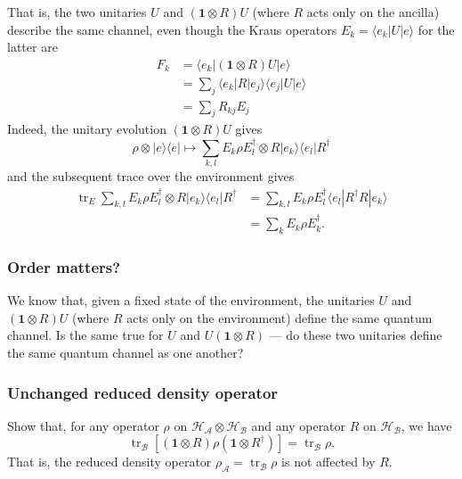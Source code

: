 \documentclass[fleqn]{article}
\begin{document}
That is, the two unitaries \(U\) and \((\mathbf{1}\otimes R)U\) (where \(R\) acts only on the ancilla) describe the same channel, even though the Kraus operators \(E_k=\langle e_k|U|e\rangle\) for the latter are
\[
  \begin{aligned}
    F_k
    &= \langle e_k|(\mathbf{1}\otimes R)U|e\rangle
  \\&= \sum_j \langle e_k|R|e_j\rangle\langle e_j|U|e\rangle
  \\&= \sum_j R_{kj}E_j
  \end{aligned}
\]
Indeed, the unitary evolution \((\mathbf{1}\otimes R) U\) gives
\[
  \rho\otimes|e\rangle\langle e|
  \longmapsto
  \sum_{k,l} E_k \rho E_l^\dagger \otimes R|e_k\rangle\langle e_l| R^\dagger
\]
and the subsequent trace over the environment gives
\[
  \begin{aligned}
    \operatorname{tr}_E \sum_{k,l} E_k \rho E_l^\dagger \otimes R|e_k\rangle\langle e_l| R^\dagger
    &= \sum_{k,l} E_k \rho E_l^\dagger \langle e_l| R^\dagger R|e_k\rangle
  \\&= \sum_{k} E_k \rho E_k^\dagger.
  \end{aligned}
\]

\hypertarget{order-matters}{%
\subsubsection{Order matters?}\label{order-matters}}

We know that, given a fixed state of the environment, the unitaries \(U\) and \((\mathbf{1}\otimes R)U\) (where \(R\) acts only on the environment) define the same quantum channel.
Is the same true for \(U\) and \(U(\mathbf{1}\otimes R)\) --- do these two unitaries define the same quantum channel as one another?

\hypertarget{unchanged-reduced-density-operator}{%
\subsubsection{Unchanged reduced density operator}\label{unchanged-reduced-density-operator}}

Show that, for any operator \(\rho\) on \(\mathcal{H}_\mathcal{A}\otimes\mathcal{H}_\mathcal{B}\) and any operator \(R\) on \(\mathcal{H}_\mathcal{B}\), we have
\[
  \operatorname{tr}_\mathcal{B} \left[(\mathbf{1}\otimes R) \rho (\mathbf{1}\otimes R^\dagger)\right]
  = \operatorname{tr}_\mathcal{B} \rho.
\]
That is, the reduced density operator \(\rho_\mathcal{A}=\operatorname{tr}_\mathcal{B} \rho\) is not affected by \(R\).
\end{document}
